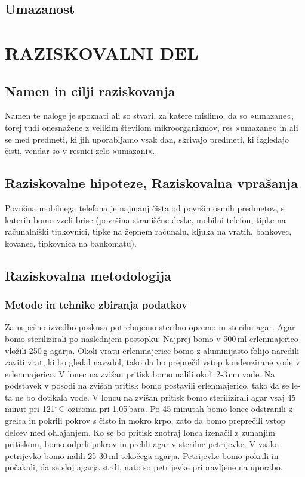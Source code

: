 \documentclass[12pt, a4paper, oneside]{report}
\begin{document}
\section{Umazanost}

\chapter{RAZISKOVALNI DEL}

\section{Namen in cilji raziskovanja}
Namen te naloge je spoznati ali so stvari, za katere mislimo, da so »umazane«, torej tudi onesnažene z velikim številom mikroorganizmov, res »umazane« in ali se med predmeti, ki jih uporabljamo vsak dan, skrivajo predmeti, ki izgledajo čisti, vendar so v resnici zelo »umazani«.

\section{Raziskovalne hipoteze, Raziskovalna vprašanja}

Površina mobilnega telefona je najmanj čista od površin osmih predmetov, s katerih bomo vzeli brise (površina straniščne deske, mobilni telefon, tipke na računalniški tipkovnici, tipke na žepnem računalu, kljuka na vratih, bankovec, kovanec, tipkovnica na bankomatu).

\section{Raziskovalna metodologija}

\subsection{Metode in tehnike zbiranja podatkov}

Za uspešno izvedbo poskusa potrebujemo sterilno opremo in sterilni agar. Agar bomo sterilizirali po naslednjem postopku: Najprej bomo v 500\,ml erlenmajerico vložili 250\,g agarja. Okoli vratu erlenmajerice bomo z aluminijasto folijo naredili zaviti vrat, ki bo gledal navzdol, tako da bo preprečil vstop kondenzirane vode v erlenmajerico. V lonec na zvišan pritisk bomo nalili okoli 2-3\,cm vode. Na podstavek v posodi na zvišan pritisk bomo postavili erlenmajerico, tako da se le-ta ne bo dotikala vode. V loncu na zvišan pritisk bomo sterilizirali agar vsaj 45 minut pri 121$^\circ$\,C oziroma pri 1,05\,bara. Po 45 minutah bomo lonec odstranili z grelca in pokrili pokrov s čisto in mokro krpo, zato da bomo preprečili vstop delcev med ohlajanjem. Ko se bo pritisk znotraj lonca izenačil z zunanjim pritiskom, bomo odprli pokrov in prelili agar v sterilne petrijevke. V vsako petrijevko bomo nalili 25-30\,ml tekočega agarja. Petrijevke bomo pokrili in počakali, da se sloj agarja strdi, nato so petrijevke pripravljene na uporabo.
\end{document}
